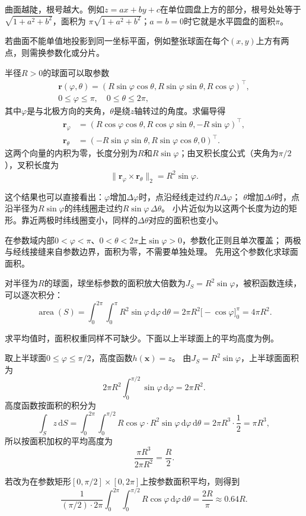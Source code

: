 曲面越陡，根号越大。例如$z=ax+by+c$在单位圆盘上方的部分，根号处处等于$\sqrt{1+a^2+b^2}$，面积为
$\pi\sqrt{1+a^2+b^2}$；$a=b=0$时它就是水平圆盘的面积$\pi$。

若曲面不能单值地投影到同一坐标平面，例如整张球面在每个$(x,y)$上方有两点，则需换参数化或分片。

半径$R>0$的球面可以取参数
\[
 \begin{gathered}
 \bm r(\varphi,\theta)
 =(R\sin\varphi\cos\theta,R\sin\varphi\sin\theta,R\cos\varphi)^\top,\\
 0\leq\varphi\leq\pi,\quad 0\leq\theta\leq2\pi,
 \end{gathered}
\]
其中$\varphi$是与北极方向的夹角，$\theta$是绕$z$轴转过的角度。求偏导得
\[
 \begin{aligned}
 \bm r_\varphi&=(R\cos\varphi\cos\theta,R\cos\varphi\sin\theta,-R\sin\varphi)^\top,\\
 \bm r_\theta&=(-R\sin\varphi\sin\theta,R\sin\varphi\cos\theta,0)^\top.
 \end{aligned}
\]
这两个向量的内积为零，长度分别为$R$和$R\sin\varphi$；由叉积长度公式（夹角为$\pi/2$），叉积长度为
\[
 \lVert\bm r_\varphi\times\bm r_\theta\rVert_2=R^2\sin\varphi.
\]

这个结果也可以直接看出：$\varphi$增加$\Delta\varphi$时，点沿经线走过约$R\Delta\varphi$；
$\theta$增加$\Delta\theta$时，点沿半径为$R\sin\varphi$的纬线圈走过约$R\sin\varphi\,\Delta\theta$。
小片近似为以这两个长度为边的矩形。靠近两极时纬线圈变小，同样的$\Delta\theta$对应的面积也变小。

在参数域内部$0<\varphi<\pi$、$0<\theta<2\pi$上$\sin\varphi>0$，参数化正则且单次覆盖；
两极与经线接缝来自参数边界，面积为零，不需要单独处理。
先用这个参数化求球面面积。

\begin{example}[球面的面积]
\label{ex:analysis-sphere-area}
对半径为$R$的球面，球坐标参数的面积放大倍数为$J_S=R^2\sin\varphi$，被积函数连续，可以逐次积分：
\[
 \operatorname{area}(S)
 =\int_0^{2\pi}\int_0^\pi R^2\sin\varphi\,\mathrm d\varphi\,\mathrm d\theta
 =2\pi R^2\bigl[-\cos\varphi\bigr]_0^\pi
 =4\pi R^2.
\]
\end{example}

求平均值时，面积权重同样不可缺少。下面以上半球面上的平均高度为例。

\begin{example}[上半球面的平均高度]
\label{ex:analysis-hemisphere-average-height}
取上半球面$0\leq\varphi\leq\pi/2$，高度函数$h(\bm x)=z$。
由$J_S=R^2\sin\varphi$，上半球面面积为
\[
 2\pi R^2\int_0^{\pi/2}\sin\varphi\,\mathrm d\varphi=2\pi R^2.
\]
高度函数按面积的积分为
\[
 \int_Sz\,\mathrm dS
 =\int_0^{2\pi}\int_0^{\pi/2}R\cos\varphi\cdot R^2\sin\varphi\,\mathrm d\varphi\,\mathrm d\theta
 =2\pi R^3\cdot\frac12=\pi R^3,
\]
所以按面积加权的平均高度为
\[
 \frac{\pi R^3}{2\pi R^2}=\frac R2.
\]

若改为在参数矩形$[0,\pi/2]\times[0,2\pi]$上按参数面积平均，则得到
\[
 \frac1{(\pi/2)\cdot2\pi}\int_0^{2\pi}\int_0^{\pi/2}R\cos\varphi\,\mathrm d\varphi\,\mathrm d\theta
 =\frac{2R}{\pi}\approx0.64R.
\]
\end{example}

